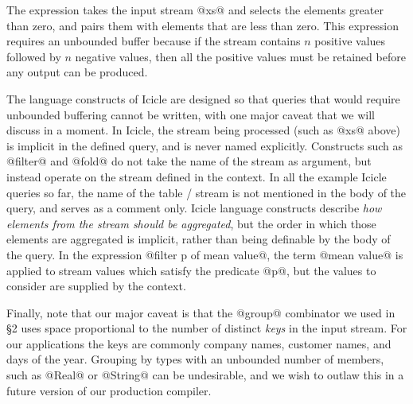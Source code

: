 The expression takes the input stream @xs@ and selects the elements greater than zero, and pairs them with elements that are less than zero. This expression requires an unbounded buffer because if the stream contains $n$ positive values followed by $n$ negative values, then all the positive values must be retained before any output can be produced. 

The language constructs of Icicle are designed so that queries that would require unbounded buffering cannot be written, with one major caveat that we will discuss in a moment. In Icicle, the stream being processed (such as @xs@ above) is implicit in the defined query, and is never named explicitly. Constructs such as @filter@ and @fold@ do not take the name of the stream as argument, but instead operate on the stream defined in the context. In all the example Icicle queries so far, the name of the table / stream is not mentioned in the body of the query, and serves as a comment only. Icicle language constructs describe \emph{how elements from the stream should be aggregated}, but the order in which those elements are aggregated is implicit, rather than being definable by the body of the query. In the expression @filter p of mean value@, the term @mean value@ is applied to stream values which satisfy the predicate @p@, but the values to consider are supplied by the context.

Finally, note that our major caveat is that the @group@ combinator we used in \S2 uses space proportional to the number of distinct \emph{keys} in the input stream.
For our applications the keys are commonly company names, customer names, and days of the year.
Grouping by types with an unbounded number of members, such as @Real@ or @String@ can be undesirable, and we wish to outlaw this in a future version of our production compiler.



\eject
